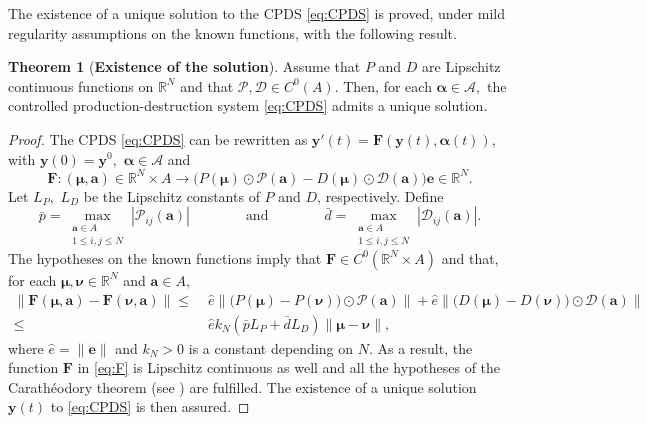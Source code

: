 \documentclass[10pt]{article}
\theoremstyle{remark}
\theoremstyle{definition}
\newtheorem{thm}{Theorem}
\theoremstyle{remark}
\begin{document}
The existence of a unique solution to the CPDS \eqref{eq:CPDS} is proved, under mild regularity assumptions on the known functions, with the following result.

\begin{thm}[\textbf{Existence of the solution}]\label{thm:Existence of a solution}
    Assume that $P$ and $D$ are Lipschitz continuous functions on $\mathbb{R}^N$ and that $\mathcal{P},\mathcal{D}\in C^0(A).$  Then, for each $\bm{\alpha}\in\mathcal{A},$ the controlled production-destruction system \eqref{eq:CPDS} admits a unique solution. 
\end{thm}
\begin{proof}
    The CPDS \eqref{eq:CPDS} can be rewritten as $\bm{y}'(t)= \bm{F}(\bm{y}(t),\bm{\alpha}(t))$, with $\bm{y}(0)=\bm{y}^0,$  $\bm{\alpha}\in \mathcal{A}$ and
    \begin{equation}\label{eq:F}
        \bm{F} : (\bm{\mu},\bm{a})\in \mathbb{R}^N\times A \longrightarrow \big(P(\bm{\mu})\odot \mathcal{P}(\bm{a})-D(\bm{\mu})\odot \mathcal{D}(\bm{a}) \big) \bm{e}  \in \mathbb{R}^N.
    \end{equation}
    Let $L_P,$ $L_D$ be the Lipschitz constants of $P$ and $D$, respectively. Define 
    \begin{equation*}
        \bar{p}=\!\!\max_{\substack{\bm{a}\in A \\ 1\leq i,j\leq N}}|\mathcal{P}_{ij}(\bm{a})| \qquad \qquad \text{and} \qquad \qquad  \bar{d}=\!\!\max_{\substack{\bm{a}\in A \\ 1\leq i,j\leq N}}|\mathcal{D}_{ij}(\bm{a})|.
    \end{equation*}
    The hypotheses on the known functions imply that $\bm{F}\in C^0(\mathbb{R}^N\times A)$ and that, for each $\bm{\mu},\bm{\nu} \in \mathbb{R}^N$ and $\bm{a}\in A,$ 
    \begin{equation*}
        \begin{split}
            \|\bm{F}(\bm{\mu},\bm{a})-\bm{F}(\bm{\nu},\bm{a}) \| \leq \; & \hat{e}\|\big (P(\bm{\mu})-P(\bm{\nu}))\odot \mathcal{P}(\bm{a})  \|+\hat{e}\|\big (D(\bm{\mu})-D(\bm{\nu}))\odot \mathcal{D}(\bm{a}) \| \\
            \leq \; &\hat{e}k_N\left(\bar{p}L_P  +\bar{d}L_D\right)\|\bm{\mu}-\bm{\nu}\|,
        \end{split}
    \end{equation*}
    where $\hat{e}=\|\bm{e}\|$ and $k_N>0$ is a constant depending on $N.$ As a result, the function $\bm{F}$ in \eqref{eq:F} is Lipschitz continuous as well and all the hypotheses of the Carathéodory theorem (see \cite[Theorem 8.1]{FalconeFerretti}) are fulfilled. The existence of a unique solution $\bm{y}(t)$ to \eqref{eq:CPDS} is then assured.
\end{proof}
\end{document}

